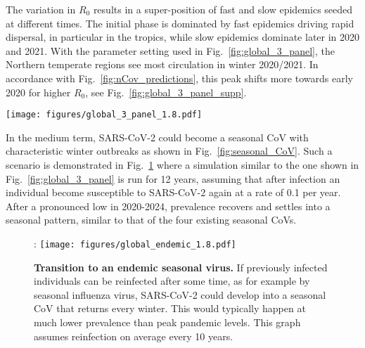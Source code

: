 \documentclass[rmp, reprint, superscriptaddress, floatfix,amsmath]{revtex4-1}
\begin{document}
The variation in $R_0$ results in a super-position of fast and slow epidemics seeded at different times.
The initial phase is dominated by fast epidemics driving rapid dispersal, in particular in the tropics, while slow epidemics dominate later in 2020 and 2021.
With the parameter setting used in Fig.~\ref{fig:global_3_panel}, the Northern temperate regions see most circulation in winter 2020/2021. 
In accordance with Fig.~\ref{fig:nCov_predictions}, this peak shifts more towards early 2020 for higher $R_0$, see Fig.~\ref{fig:global_3_panel_supp}.

\begin{figure*}[tb]
    \centering
    \texttt{[image: figures/global\_3\_panel\_1.8.pdf]}
    \caption{{\bf Exended circulation through overlapping epidemics in variable subpopulations.} These simulations of a pandemic scenario assume 1,000 sub-populations with an average $\langle R_0=1.8\rangle$ and standard deviation $0.5$, 40\% of which have weak seasonal variation $\epsilon \in [0,0.2]$ (tropical) and the remainder strong variation with $\epsilon \in [0.25,0.75]$. The super-position of many variable epidemics can result in a global prevalence that decays only slowly through 2020 and 2021. 
    Lighter lines have lower $R_0$, darker lines have higher $R_0$. 
    The actual case counts reported for Hubei are added to the first panel and multiplied by three to account for possible under-reporting of mild cases.
    Analogous figures for different parameter values are shown in Fig.~\ref{fig:global_3_panel_supp}.}
    \label{fig:global_3_panel}
\end{figure*}

In the medium term, SARS-CoV-2 could become a seasonal CoV with characteristic winter outbreaks as shown in Fig.~\ref{fig:seasonal_CoV}.
Such a scenario is demonstrated in Fig.~\ref{fig:endemic} where a simulation similar to the one shown in Fig.~\ref{fig:global_3_panel} is run for 12 years, assuming that after infection an individual become susceptible to SARS-CoV-2 again at a rate of 0.1 per year. 
After a pronounced low in 2020-2024, prevalence recovers and settles into a seasonal pattern, similar to that of the four existing seasonal CoVs. 

\begin{figure}
    \centering
:    \texttt{[image: figures/global\_endemic\_1.8.pdf]}
    \caption{{\bf Transition to an endemic seasonal virus.} 
    If previously infected individuals can be reinfected after some time, as for example by seasonal influenza virus, SARS-CoV-2 could develop into a seasonal CoV that returns every winter. This would typically happen at much lower prevalence than peak pandemic levels. 
    This graph assumes reinfection on average every 10 years.}
    \label{fig:endemic}
\end{figure}
\end{document}
